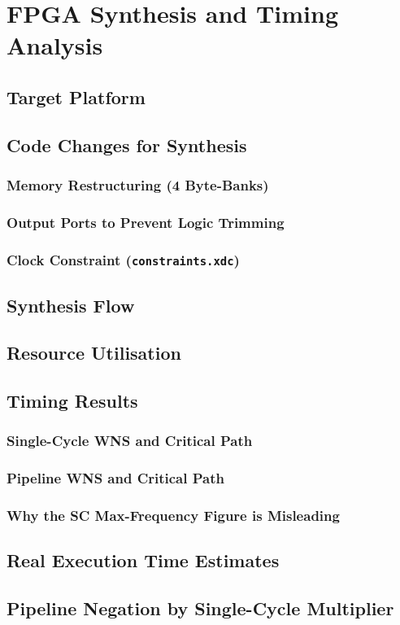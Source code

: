 \chapter{FPGA Synthesis and Timing Analysis}
\label{ch:synth}

\section{Target Platform}

\section{Code Changes for Synthesis}
\subsection{Memory Restructuring (4 Byte-Banks)}
\subsection{Output Ports to Prevent Logic Trimming}
\subsection{Clock Constraint (\texttt{constraints.xdc})}

\section{Synthesis Flow}

\section{Resource Utilisation}

\section{Timing Results}
\subsection{Single-Cycle WNS and Critical Path}
\subsection{Pipeline WNS and Critical Path}
\subsection{Why the SC Max-Frequency Figure is Misleading}

\section{Real Execution Time Estimates}

\section{Pipeline Negation by Single-Cycle Multiplier}
